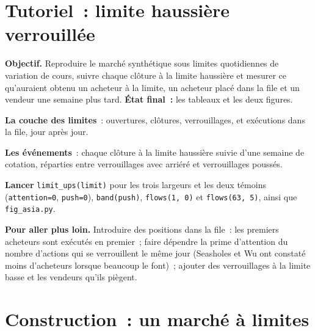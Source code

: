\section{Tutoriel~: limite haussière verrouillée}\label{tut:s1:asia-specific-equity-strategies:tut}

\begin{tutorial}
\textbf{Objectif.} Reproduire le marché synthétique sous limites quotidiennes de variation de cours, suivre chaque clôture à la limite haussière et mesurer ce qu'auraient obtenu un acheteur à la limite, un acheteur placé
dans la file et un vendeur une semaine plus tard. \textbf{État final~:} les tableaux et les deux figures.
\begin{tutsteps}
\item \textbf{La couche des limites}~: ouvertures, clôtures, verrouillages,  et exécutions dans la file, jour après jour.
\label{lst:s1:asia-specific-equity-strategies:limits}
\item \textbf{Les événements}~: chaque clôture à la limite haussière suivie d'une semaine de cotation, réparties entre verrouillages avec arriéré et verrouillages poussés.
\label{lst:s1:asia-specific-equity-strategies:ups}
\item \textbf{Lancer} \texttt{limit\_ups(limit)} pour les trois largeurs et les deux témoins (\texttt{attention=0}, \texttt{push=0}), \texttt{band(push)},
\texttt{flows(1, 0)} et \texttt{flows(63, 5)}, ainsi que \texttt{fig\_asia.py}.
\end{tutsteps}
\textbf{Pour aller plus loin.} Introduire des positions dans la file~: les premiers acheteurs sont exécutés en premier~; faire dépendre la prime d'attention du nombre d'actions qui se verrouillent le même jour
(Seasholes et Wu ont constaté moins d'acheteurs lorsque beaucoup le font)~; ajouter des verrouillages à la limite basse et les vendeurs qu'ils piègent.
\end{tutorial}

\section{Construction~: un marché à limites}\label{bld:s1:asia-specific-equity-strategies:limitmkt}

